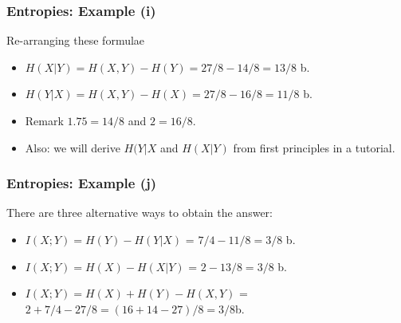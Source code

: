 ﻿\documentclass[a4]{beamer}
\begin{document}

\begin{frame}
\frametitle{Entropies: Example (i)}
Re-arranging these formulae
\begin{itemize}
\item $H(X|Y) = H(X,Y)-H(Y) = 27/8 - 14/8 = 13/8$ b. \bigskip
\item $H(Y|X) = H(X,Y)-H(X) = 27/8 - 16/8 = 11/8$ b.
\end{itemize}
\bigskip
\begin{itemize}
\item Remark $1.75 =14/8$ and $2 = 16/8$.\\\bigskip
\item Also: we will derive $H(Y|X$ and $H(X|Y)$ from first principles in a tutorial.
\end{itemize}
\end{frame}

\begin{frame}
\frametitle{Entropies: Example (j)}
There are three alternative ways to obtain the answer:
\begin{itemize}
\item $I(X; Y ) = H(Y ) - H(Y |X)$ = $7/4 - 11/8 = 3/8$ b.
\item $I(X; Y ) = H(X) - H(X|Y)$ = $2 - 13/8 = 3/8$ b.
\item $I(X; Y ) = H(X) + H(Y ) - H(X,Y )$ = $2 + 7/4 - 27/8 = (16+14-27)/8 = 3/8$b.
\end{itemize}
\end{frame}
\end{document}
